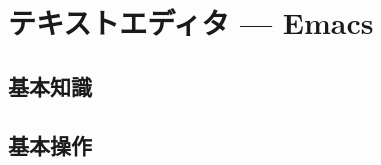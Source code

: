 \documentclass[main]{subfiles}
\begin{document}
\chapter{テキストエディタ --- Emacs}
\section{基本知識}
\section{基本操作}
\end{document}
